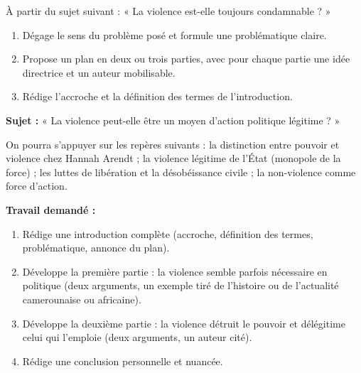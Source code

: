 \documentclass[11pt]{article}
\newcommand{\cle}[1]{{\popxbold\color{popdark}#1}}
\newcounter{popsec}
\newcounter{popsub}
\newcommand{\courssub}[1]{%
  \stepcounter{popsub}%
  \par\vspace{9pt}\noindent{\popxbold\fontsize{11.5}{13}\selectfont\color{popink}{\color{poporange}\thepopsec.\thepopsub}\hspace{6pt}#1}\par\nopagebreak\vspace{4pt}
}
\begin{document}
\begin{exercice}
À partir du sujet suivant : « La violence est-elle toujours condamnable ? »
\begin{enumerate}
\item Dégage le sens du problème posé et formule une problématique claire.
\item Propose un plan en deux ou trois parties, avec pour chaque partie une idée directrice et un auteur mobilisable.
\item Rédige l'accroche et la définition des termes de l'introduction.
\end{enumerate}
\end{exercice}

\courssub{Je me prépare au Bac}

\begin{exercice}
\textbf{Sujet :} « La violence peut-elle être un moyen d'action politique légitime ? »

On pourra s'appuyer sur les repères suivants : la distinction entre \cle{pouvoir} et \cle{violence} chez Hannah Arendt ; la \cle{violence légitime} de l'État (monopole de la force) ; les luttes de libération et la désobéissance civile ; la non-violence comme force d'action.

\textbf{Travail demandé :}
\begin{enumerate}
\item Rédige une introduction complète (accroche, définition des termes, problématique, annonce du plan).
\item Développe la première partie : la violence semble parfois nécessaire en politique (deux arguments, un exemple tiré de l'histoire ou de l'actualité camerounaise ou africaine).
\item Développe la deuxième partie : la violence détruit le pouvoir et délégitime celui qui l'emploie (deux arguments, un auteur cité).
\item Rédige une conclusion personnelle et nuancée.
\end{enumerate}
\end{exercice}
\end{document}
